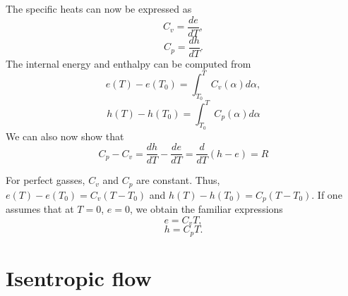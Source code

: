 \documentclass[oneside,a4paper,11pt]{report}
\begin{document}
The specific heats can now be expressed as
\begin{equation}
    C_v = \frac{de}{dT},
\end{equation}
\begin{equation}
    C_p = \frac{dh}{dT}.
\end{equation}
The internal energy and enthalpy can be computed from
\begin{equation}
    e(T) - e(T_0) = \int_{T_0}^{T} C_v(\alpha) d\alpha,
\end{equation}
\begin{equation}
    h(T) - h(T_0) = \int_{T_0}^{T} C_p(\alpha) d\alpha
\end{equation}
We can also now show that 
\begin{equation}
    C_p - C_v = \frac{dh}{dT} - \frac{de}{dT} = \frac{d}{dT} (h-e) = R
\end{equation}

For perfect gasses, $C_v$ and $C_p$ are constant. Thus, $e(T) - e(T_0) = C_v (T - T_0)$ and $h(T) - h(T_0) = C_p (T - T_0)$. If one assumes that at $T = 0$, $e = 0$, we obtain the familiar expressions
\begin{equation}
    e = C_v T,
\end{equation}
\begin{equation}
    h = C_p T.
\end{equation}

\section{Isentropic flow}

\end{document}
